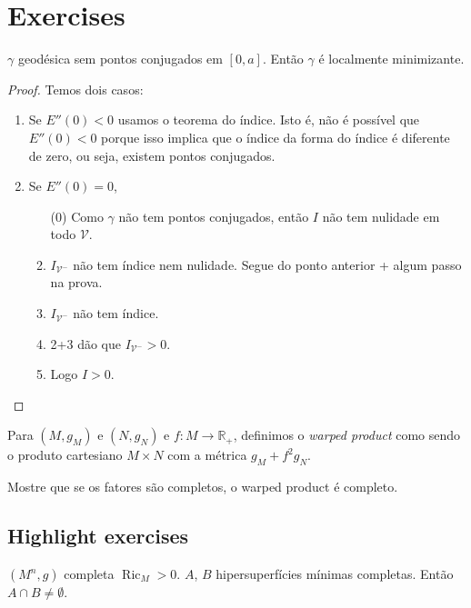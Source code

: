 \section{Exercises}
\label{section-exercises}

\begin{exercise}
\label{exercise-geodesica-sem-pontos-conjugados-e-localmente-minimizante}
$\gamma$ geodésica sem pontos conjugados em $[0,a]$. Então $\gamma$ é localmente
minimizante.
\end{exercise}

\begin{proof}
Temos dois casos:
\begin{enumerate}
\item Se $E''(0)<0$ usamos o teorema do índice. Isto é, não é possível que
 $E''(0)<0$ porque isso implica que o índice da forma do índice é diferente
 de zero, ou seja, existem pontos conjugados.
\item Se $E''(0)=0$,
\begin{enumerate}
\item[(0)] Como $\gamma$ não tem pontos conjugados, então $I$ não tem
nulidade em todo  $\mathcal{V}$.
\item $I_{\mathcal{V}^-}$ não tem índice nem nulidade. Segue do ponto anterior + 
algum passo na prova.
\item $I_{\mathcal{V}^-}$ não tem índice.
\item 2+3 dão que $I_{\mathcal{V}^-}>0$.
\item Logo $I>0$.
\end{enumerate}
\end{enumerate}
\end{proof}

\begin{exercise}
\label{exercise-wraped-product}
Para $(M,g_M)$ e $(N,g_N)$ e $f:M \to \mathbb{R}_+$, definimos o {\it warped
product} como sendo o produto cartesiano $M\times N$ com a métrica 
 $g_M+f^2g_N$.

Mostre que se os fatores são completos, o warped product é completo.
\end{exercise}

\subsection{Highlight exercises}
\label{subsection-highlight-exercises}
\begin{exercise}
\label{exercise-minimal-intersection}
$(M^n,g)$ completa $\operatorname{Ric}_M>0$. $A$, $B$ hipersuperfícies mínimas
completas. Então  $A \cap B \neq \emptyset$.
\end{exercise}

